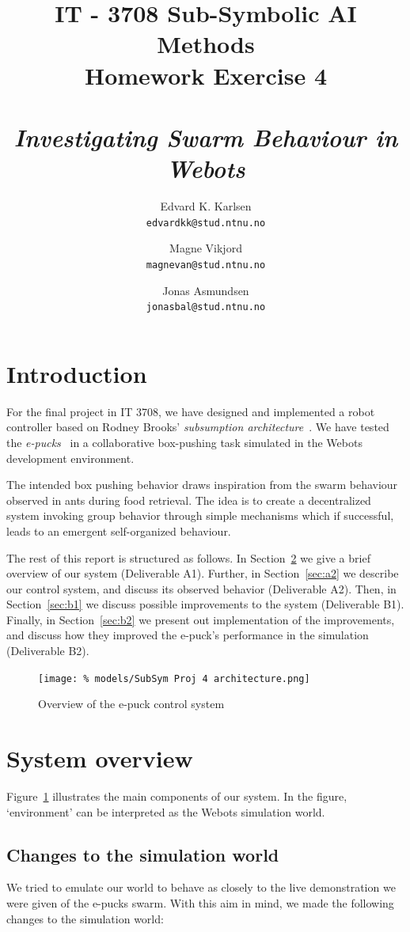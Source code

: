 \documentclass[a4paper,10pt]{article}
\title{
    IT - 3708 Sub-Symbolic AI Methods \\
    Homework Exercise 4\\
    ~\\
    \emph{Investigating Swarm Behaviour in Webots}
}
\author{
    Edvard K. Karlsen \\
    \texttt{edvardkk@stud.ntnu.no}
    \and
    Magne Vikjord \\
    \texttt{magnevan@stud.ntnu.no}
    \and
    Jonas Asmundsen \\
    \texttt{jonasbal@stud.ntnu.no}
}
\date {}
\begin{document}
\maketitle

\section{Introduction}
For the final project in IT 3708, we have designed and implemented a robot
controller based on Rodney Brooks' \emph{subsumption
architecture}~\cite{brooks1986}.  We have tested the
\emph{e-pucks}~\cite{bonani2009} in a collaborative box-pushing task simulated
in the Webots development environment.  

The intended box pushing behavior draws inspiration from the swarm behaviour
observed in ants during food retrieval.  The idea is to create a decentralized
system invoking group behavior through simple mechanisms which if successful,
leads to an emergent self-organized behaviour.

The rest of this report is structured as follows. In Section~\ref{sec:a1} we
give a brief overview of our system (Deliverable A1).  Further, in
Section~\ref{sec:a2} we describe our control system, and discuss its observed
behavior (Deliverable A2). Then, in Section~\ref{sec:b1} we discuss possible
improvements to the system (Deliverable B1). Finally, in Section~\ref{sec:b2}
we present out implementation of the improvements, and discuss how they
improved the e-puck's performance in the simulation (Deliverable B2).

\begin{figure}[!h]
  \centering
  \texttt{[image: \%
    models/SubSym Proj 4 architecture.png]}
    \caption{Overview of the e-puck control system}
  \label{fig:architecture}
\end{figure}

\section{System overview}
\label{sec:a1}

Figure~\ref{fig:architecture} illustrates the main components of our system.
In the figure, `environment' can be interpreted as the Webots simulation
world.

\subsection{Changes to the simulation world}
We tried to emulate our world to behave as closely to the live demonstration
we were given of the e-pucks swarm. With this aim in mind, we made the
following changes to the simulation world:
\end{document}
